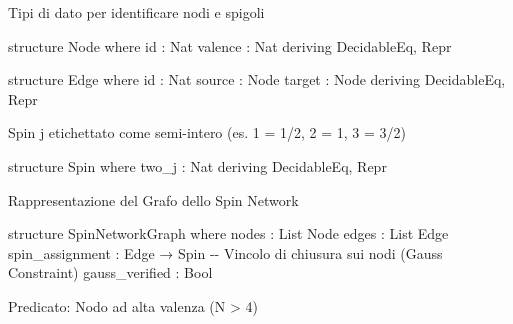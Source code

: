 \documentclass{article}
\newenvironment{Shaded}{%
  \begin{snugshade}%
}{%
  \end{snugshade}%
}%
\newenvironment{Highlighting}{%
}{%
}%
\newcommand{\NormalTok}[1]{#1}
\begin{document}
Tipi di dato per identificare nodi e spigoli

\begin{Shaded}
\begin{Highlighting}[]
\NormalTok{structure Node where}
\NormalTok{  id : Nat}
\NormalTok{  valence : Nat}
\NormalTok{  deriving DecidableEq, Repr}

\NormalTok{structure Edge where}
\NormalTok{  id : Nat}
\NormalTok{  source : Node}
\NormalTok{  target : Node}
\NormalTok{  deriving DecidableEq, Repr}

\end{Highlighting}
\end{Shaded}

Spin j etichettato come semi-intero (es. 1 = 1/2, 2 = 1, 3 = 3/2)

\begin{Shaded}
\begin{Highlighting}[]
\NormalTok{structure Spin where}
\NormalTok{  two\_j : Nat}
\NormalTok{  deriving DecidableEq, Repr}

\end{Highlighting}
\end{Shaded}

Rappresentazione del Grafo dello Spin Network

\begin{Shaded}
\begin{Highlighting}[]
\NormalTok{structure SpinNetworkGraph where}
\NormalTok{  nodes : List Node}
\NormalTok{  edges : List Edge}
\NormalTok{  spin\_assignment : Edge → Spin}
\NormalTok{  {-}{-} Vincolo di chiusura sui nodi (Gauss Constraint)}
\NormalTok{  gauss\_verified : Bool}

\end{Highlighting}
\end{Shaded}

Predicato: Nodo ad alta valenza (N \textgreater{} 4)
\end{document}
